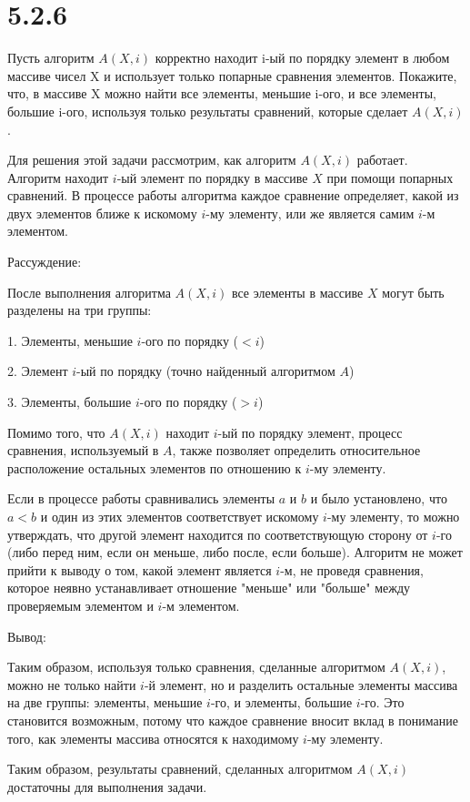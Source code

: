 \section*{5.2.6}
Пусть алгоритм \(A(X, i)\) корректно находит i-ый по порядку элемент в любом массиве чисел X и использует только попарные сравнения элементов. Покажите, что, в массиве X можно найти все элементы, меньшие i-ого, и все элементы, большие i-ого, используя только результаты сравнений, которые сделает \(A(X, i)\).

Для решения этой задачи рассмотрим, как алгоритм \(A(X, i)\) работает. Алгоритм находит \(i\)-ый элемент по порядку в массиве \(X\) при помощи попарных сравнений. В процессе работы алгоритма каждое сравнение определяет, какой из двух элементов ближе к искомому \(i\)-му элементу, или же является самим \(i\)-м элементом.

Рассуждение:

После выполнения алгоритма \(A(X, i)\) все элементы в массиве \(X\) могут быть разделены на три группы:

1. Элементы, меньшие \(i\)-ого по порядку (\(< i\))

2. Элемент \(i\)-ый по порядку (точно найденный алгоритмом \(A\))

3. Элементы, большие \(i\)-ого по порядку (\(> i\))

Помимо того, что \(A(X, i)\) находит \(i\)-ый по порядку элемент, процесс сравнения, используемый в \(A\), также позволяет определить относительное расположение остальных элементов по отношению к \(i\)-му элементу. 

Если в процессе работы сравнивались элементы \(a\) и \(b\) и было установлено, что \(a < b\) и один из этих элементов соответствует искомому \(i\)-му элементу, то можно утверждать, что другой элемент находится по соответствующую сторону от \(i\)-го (либо перед ним, если он меньше, либо после, если больше). Алгоритм не может прийти к выводу о том, какой элемент является \(i\)-м, не проведя сравнения, которое неявно устанавливает отношение "меньше" или "больше" между проверяемым элементом и \(i\)-м элементом.

Вывод:

Таким образом, используя только сравнения, сделанные алгоритмом \(A(X, i)\), можно не только найти \(i\)-й элемент, но и разделить остальные элементы массива на две группы: элементы, меньшие \(i\)-го, и элементы, большие \(i\)-го. Это становится возможным, потому что каждое сравнение вносит вклад в понимание того, как элементы массива относятся к находимому \(i\)-му элементу.

Таким образом, результаты сравнений, сделанных алгоритмом \(A(X, i)\) достаточны для выполнения задачи.

